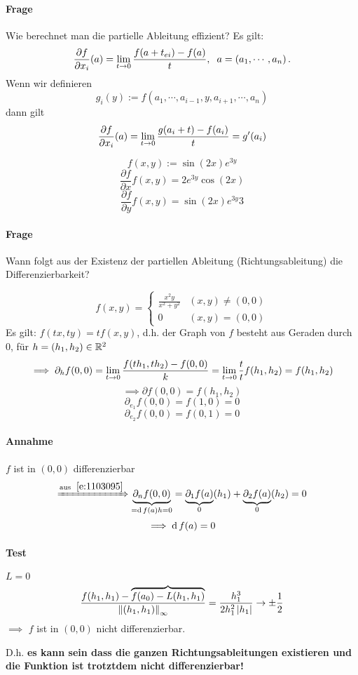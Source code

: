 \paragraph{Frage}
Wie berechnet man die partielle Ableitung effizient? Es gilt:
\[\frac{\partial f}{\partial x_i} (a)=\displaystyle\lim_{t\rightarrow0}\frac{f(a+t_{ei})-f(a)}{t},\hspace{2mm} a=(a_1,\cdots,a_n)\, .\]
Wenn wir definieren
\[g_i(y):=f(a_1,\cdots,a_{i-1},y,a_{i+1},\cdots,a_n)\]
dann gilt
\[\frac{\partial f}{\partial x_i} (a)=\displaystyle\lim_{t\rightarrow0}\frac{g(a_i+t)-f(a_i)}{t}=g'(a_i)\]
\begin{Bsp}
  \[f(x,y):=\sin(2x)e^{3y}\]
  \[\frac{\partial f}{\partial x} f (x,y) =2e^{3y}\cos(2x)\]
  \[\frac{\partial f}{\partial y} f (x,y) =\sin(2x)e^{3y}3\]
\end{Bsp}
\paragraph{Frage}
Wann folgt aus der Existenz der partiellen Ableitung (Richtungsableitung) die Differenzierbarkeit?
\begin{Bsp}
  \[f(x,y)= \begin{cases}
    \frac{x^2y}{x^2+y^2}&(x,y)\neq(0,0)\\
    0&(x,y)=(0,0)
  \end{cases}\]
  Es gilt: $f(tx,ty)=tf(x,y)$, d.h. der Graph von $f$ besteht aus Geraden durch $0$, für $h=(h_1,h_2)\in\mathbb{R}^2$
  \[\implies \partial_hf(0,0)=\displaystyle\lim_{t\rightarrow0}\frac{f(th_1,th_2)-f(0,0)}{k}=\displaystyle\lim_{t\rightarrow0}\frac{t}{t}f(h_1,h_2)=f(h_1,h_2)\]
  \[\implies \partial f(0,0)=f(h_1,h_2)\]
  \[\partial_{e_1}f(0,0)=f(1,0)=0\]
  \[\partial_{e_2}f(0,0)=f(0,1)=0\]
  \paragraph{Annahme}
  $f$ ist in $(0,0)$ differenzierbar
  \[\xRightarrow{\text{aus}\hspace{2mm}\ref{e:1103095}}\underbrace{\partial_nf(0,0)}_{=\operatorname{d} f(a)h=0}=\underbrace{\partial_1f(a)}_{0}(h_1)+\underbrace{\partial_2f(a)}_0(h_2)=0\]
  \[\implies \operatorname{d} f(a)=0\]
  \paragraph{Test}
  $L=0$
  \[\frac{f(h_1,h_1)-\overbrace{f(a_0)-L(h_1,h_1)}}{\left\| (h_1,h_1) \right\|_\infty}=\frac{h_1^3}{2h_1^2\left| h_1 \right|}\rightarrow\pm\frac{1}{2}\]
  $\implies$ $f$ ist in $(0,0)$ {\sc nicht differenzierbar}.
\end{Bsp}

D.h. {\bf es kann sein dass die ganzen Richtungsableitungen existieren und die Funktion ist trotztdem
nicht differenzierbar!}
